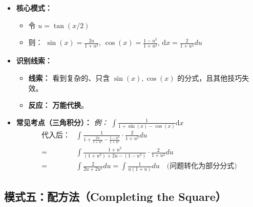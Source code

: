 \documentclass[lang=cn,math=mtpro2,11pt,scheme=chinese]{elegantbook}
\begin{document}
\begin{itemize}
    \item \textbf{核心模式：}
    \begin{itemize}
        \item 令 $u = \tan(x/2)$
        \item 则： $\sin(x) = \frac{2u}{1+u^2}$, $\cos(x) = \frac{1-u^2}{1+u^2}$, $\mathrm{d}x = \frac{2}{1+u^2} du$
    \end{itemize}
    
    \item \textbf{识别线索：}
    \begin{itemize}
        \item \textbf{线索：} 看到复杂的、只含 $\sin(x), \cos(x)$ 的分式，且其他技巧失效。
        \item \textbf{反应：} \textbf{万能代换}。
    \end{itemize}

    \item \textbf{常见考点（三角积分）：}
    \textit{例：} $\int \frac{1}{1 + \sin(x) - \cos(x)} \mathrm{d}x$
    \begin{align*}
        \text{代入后：} & \int \frac{1}{1 + \frac{2u}{1+u^2} - \frac{1-u^2}{1+u^2}} \cdot \frac{2}{1+u^2} du \\
        = & \int \frac{1+u^2}{(1+u^2) + 2u - (1-u^2)} \cdot \frac{2}{1+u^2} du \\
        = & \int \frac{2}{2u + 2u^2} du = \int \frac{1}{u(1+u)} du \quad \text{(问题转化为部分分式)}
    \end{align*}
\end{itemize}

\subsection{模式五：配方法（Completing the Square）}
\end{document}
